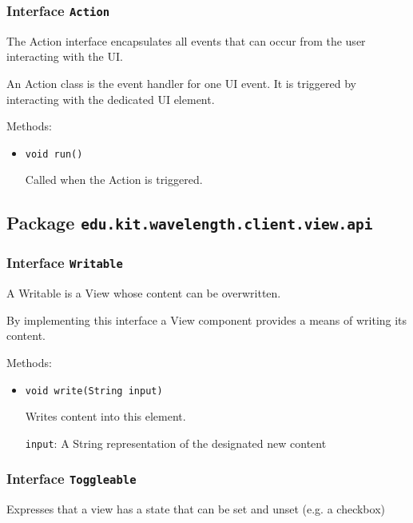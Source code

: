 \subsubsection{Interface \texttt{Action}}
\label{type:edu.kit.wavelength.client.view.action.Action}
The Action interface encapsulates all events that can occur from the user
 interacting with the UI.
 
 An Action class is the event handler for one UI event. It is triggered by
 interacting with the dedicated UI element.

Methods:
\begin{itemize}
\item \texttt{void run()}

Called when the Action is triggered.

\end{itemize}

\subsection{Package \lstinline{edu.kit.wavelength.client.view.api}}
\label{pkg:edu.kit.wavelength.client.view.api}


\subsubsection{Interface \texttt{Writable}}
\label{type:edu.kit.wavelength.client.view.api.Writable}
A Writable is a View whose content can be overwritten.
 
 By implementing this interface a View component provides a means of writing
 its content.

Methods:
\begin{itemize}
\item \texttt{void write(String input)}

Writes content into this element.

\texttt{input}: A String representation of the designated new content

\end{itemize}

\subsubsection{Interface \texttt{Toggleable}}
\label{type:edu.kit.wavelength.client.view.api.Toggleable}
Expresses that a view has a state that can be set and unset (e.g. a checkbox)

